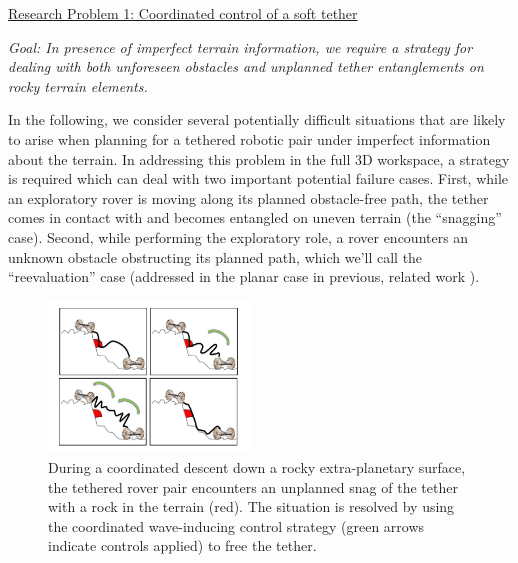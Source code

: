 \documentclass[12pt]{article}
\begin{document}

\noindent\underline{Research Problem 1: Coordinated control of a soft tether}

{\sl Goal: In presence of imperfect terrain information, we require a
  strategy for dealing with both unforeseen obstacles and unplanned
  tether entanglements on rocky terrain elements. }


In the following, we consider several potentially difficult situations
that are likely to arise when planning for a tethered robotic pair
under imperfect information about the terrain. In addressing this
problem in the full 3D workspace, a strategy is required which can
deal with two important potential failure cases. First, while an
exploratory rover is moving along its planned obstacle-free path, the
tether comes in contact with and becomes entangled on uneven terrain
(the ``snagging'' case). Second, while performing the exploratory
role, a rover encounters an unknown obstacle obstructing its planned
path, which we'll call the ``reevaluation'' case (addressed in the
planar case in previous, related work \cite{axel_online}).

\begin{figure}
  \begin{center}
    \vspace{-0.3in}
    \includegraphics[width=0.48\textwidth, right]{tether_desnag.jpg}
  \end{center}
  \vspace{-0.4in}
  \caption{During a coordinated descent down a rocky extra-planetary
    surface, the tethered rover pair encounters an unplanned snag of
    the tether with a rock in the terrain (red). The situation is
    resolved by using the coordinated wave-inducing control strategy
    (green arrows indicate controls applied) to free the tether.}
  \label{fig:tethersnag}
\end{figure}
\end{document}

